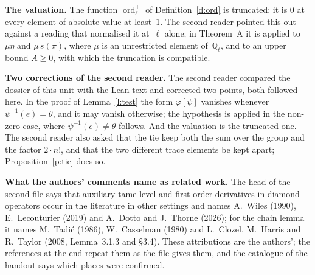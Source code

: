 \documentclass[11pt,a4paper]{article}
\newcommand{\m}[1]{\mbox{$#1$}}        %
\newcommand{\subhead}[1]{\par\addvspace{9pt plus 2pt}\Needspace{4\baselineskip}\noindent\textbf{#1}\enspace\ignorespaces}
\theoremstyle{plainx}
\theoremstyle{uprightx}
\newcommand{\Ql}{\bar{\mathbb{Q}}_\ell}
\newcommand{\ordp}{\operatorname{ord}^{+}_{\ell}}
\begin{document}
\subhead{The valuation.} The function \m{\ordp} of Definition~\ref{d:ord} is truncated: it is $0$ at every element
of absolute value at least~$1$. The second reader pointed this out against a reading that normalised it
at~$\ell$ alone; in Theorem~A it is applied to \m{\mu\eta} and \m{\mu\,s(\pi)}, where $\mu$ is an unrestricted
element of~$\Ql$, and to an upper bound \m{A\ge0}, with which the truncation is compatible.

\subhead{Two corrections of the second reader.} The second reader compared the dossier of this unit with the
Lean text and corrected two points, both followed here. In the proof of Lemma~\ref{l:test} the form
\m{\varphi[\psi]} vanishes whenever \m{\psi^{-1}(e)=\theta}, and it may vanish otherwise; the hypothesis is applied
in the non-zero case, where \m{\psi^{-1}(e)\ne\theta} follows. And the valuation is the truncated one. The second
reader also asked that the tie keep both the sum over the group and the factor \m{2\cdot n!}, and that the two
different trace elements be kept apart; Proposition~\ref{p:tie} does so.

\subhead{What the authors' comments name as related work.} The head of the second file says that auxiliary tame
level and first-order derivatives in diamond operators occur in the literature in other settings and names
A.~Wiles (1990), E.~Lecouturier (2019) and A.~Dotto and J.~Thorne (2026); for the chain lemma it names M.~Tadić
(1986), W.~Casselman (1980) and L.~Clozel, M.~Harris and R.~Taylor (2008, Lemma~3.1.3 and §3.4). These attributions
are the authors'; the references at the end repeat them as the file gives them, and the catalogue of the handout
says which places were confirmed.
\end{document}
